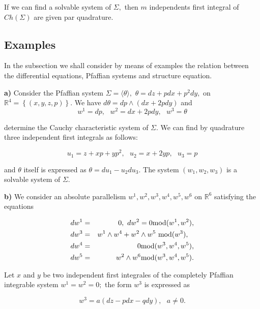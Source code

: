 \documentclass{amsproc}
\theoremstyle{remark}
\numberwithin{equation}{section}
\begin{document}
If we can find a solvable system of $\Sigma ,$ then $m$ independents first
integral of $Ch(\Sigma )$ are given par quadrature.

\subsection{Examples}

In the subsection we shall consider by means of examples \cite{Ab2} the relation
between the differential equations, Pfaffian systems and structure equation.

\textbf{a) }Consider the Pfaffian system $\Sigma =\langle \theta \rangle ,$ $\theta =dz+pdx+p^{2}dy,$ on $\mathbb{R}
^{4}=\left\{ \left( x,y,z,p\right) \right\} $. We have $d\theta =dp\wedge
\left( dx+2pdy\right) $ and 
\begin{equation*}
w^{1}=dp,\text{ }w^{2}=dx+2pdy,\text{ }w^{3}=\theta
\end{equation*}

determine the Cauchy characteristic system of $\Sigma .$ We can find by
quadrature three independent first integrals as follows:

\begin{equation*}
u_{1}=z+xp+yp^{2},\text{ }u_{2}=x+2yp,\text{ }u_{3}=p
\end{equation*}

and $\theta $ itself is expressed as $\theta =du_{1}-u_{2}du_{3}.$ The
system $(w_{1},w_{2},w_{3})$ is a solvable system of $\Sigma .$

\textbf{b) }We consider an absolute parallelism $w^{1},w^{2},w^{3},w^{4},w^{5},w^{6}$ on $\mathbb{R}
^{6}$ satisfying the equations

\begin{eqnarray}
dw^{1} &=&0,\text{ }dw^{2}=0{\mathop{\mbox{\rm {mod}}}}(w^{1},w^{2}), \notag\\
dw^{3} &=&w^{1}\wedge w^{4}+w^{2}\wedge w^{5}\text{ }{\mathop{\mbox{\rm {mod}}}}(w^{3}),
   \label{eq:parallelism}
    \text{\ \ } \\
dw^{4} &=&0{\mathop{\mbox{\rm {mod}}}}(w^{3},w^{4},w^{5}), \notag\\
dw^{5} &=&w^{2}\wedge w^{6}{\mathop{\mbox{\rm {mod}}}}(w^{3},w^{4},w^{5}).\notag
\end{eqnarray}

Let $x$ and $y$ be two independent first integrales of the completely
Pfaffian integrable system $w^{1}=w^{2}=0;$ the form $w^{3}$ is expressed as

\begin{equation*}
w^{3}=a(dz-pdx-qdy),\text{ \ \ }a\neq 0.
\end{equation*}
\end{document}
